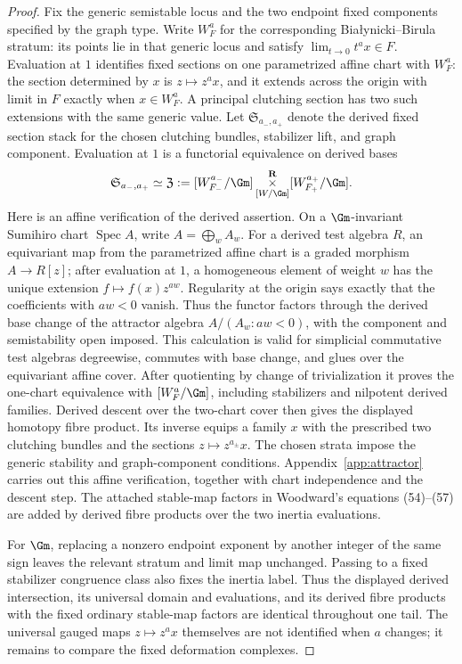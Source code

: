 \begin{proof}
Fix the generic semistable locus and the two endpoint fixed components
specified by the graph type.  Write \(W_F^a\) for the corresponding
Bia{\l}ynicki--Birula stratum: its points lie in that generic locus and satisfy
\(\lim_{t\to0}t^a x\in F\).  Evaluation at \(1\) identifies fixed sections on
one parametrized affine chart with \(W_F^a\): the section determined by
\(x\) is \(z\mapsto z^a x\), and it extends across the origin with limit in
\(F\) exactly when \(x\in W_F^a\).  A principal clutching section has two such
extensions with the same generic value.  Let \(\mathfrak S_{a_-,a_+}\) denote
the derived fixed section stack for the chosen clutching bundles, stabilizer
lift, and graph component.  Evaluation at \(1\) is a functorial equivalence on
derived bases
\[
 \mathfrak S_{a_-,a_+}\simeq
 \mathfrak Z:=
 [W_{F_-}^{a_-}/\Gm]\mathop{\times}^{\mathbf R}_{[W/\Gm]}
 [W_{F_+}^{a_+}/\Gm].
\]
Here is an affine verification of the derived assertion.  On a
\(\Gm\)-invariant Sumihiro chart \(\operatorname{Spec} A\), write
\(A=\bigoplus_w A_w\).  For a derived test algebra \(R\), an equivariant map
from the parametrized affine chart is a graded morphism
\(A\to R[z]\); after evaluation at \(1\), a homogeneous element of weight
\(w\) has the unique extension \(f\mapsto f(x)z^{aw}\).  Regularity at the
origin says exactly that the coefficients with \(aw<0\) vanish.  Thus the
functor factors through the derived base change of the attractor algebra
\(A/(A_w:aw<0)\), with the component and semistability open imposed.  This
calculation is valid for simplicial commutative test algebras degreewise,
commutes with base change, and glues over the equivariant affine cover.  After
quotienting by change of trivialization it proves the one-chart equivalence
with \([W_F^a/\Gm]\), including stabilizers and nilpotent derived families.
Derived descent over the two-chart cover then gives the displayed homotopy
fibre product.  Its inverse equips a family \(x\) with the prescribed two
clutching bundles and the sections \(z\mapsto z^{a_\pm}x\).  The chosen strata
impose the generic stability and graph-component conditions.
Appendix~\ref{app:attractor} carries out this affine verification, together
with chart independence and the descent step.
The attached stable-map factors in Woodward's equations (54)--(57) are added
by derived fibre products over the two inertia evaluations.

For \(\Gm\), replacing a nonzero endpoint exponent by another integer of the
same sign leaves the relevant stratum and limit map unchanged.  Passing to a
fixed stabilizer congruence class also fixes the inertia label.  Thus the
displayed derived intersection, its universal domain and evaluations, and its
derived fibre products with the fixed ordinary stable-map factors are
identical throughout one tail.  The universal gauged maps
\(z\mapsto z^a x\) themselves are not identified when \(a\) changes; it
remains to compare the fixed deformation complexes.


\end{proof}
